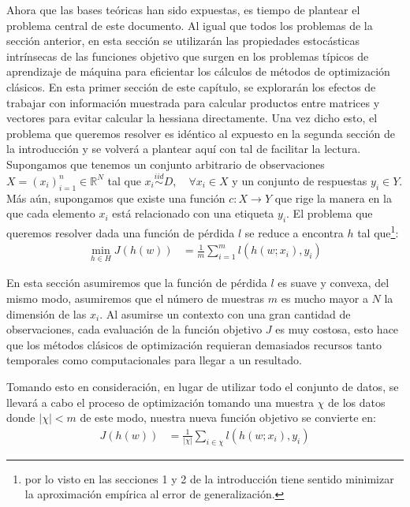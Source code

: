 \documentclass{book}
\theoremstyle{plain}
\theoremstyle{definition}
\theoremstyle{remark}
\begin{document}
Ahora que las bases teóricas han sido expuestas, es tiempo de plantear el problema central de este documento. Al igual que todos los problemas de la sección anterior, en esta sección se utilizarán las propiedades estocásticas intrínsecas de las funciones objetivo que surgen en los problemas típicos de aprendizaje de máquina para eficientar los cálculos de métodos de optimización clásicos. En esta primer sección de este capítulo, se explorarán los efectos de trabajar con información muestrada para calcular productos entre matrices y vectores para evitar calcular la hessiana directamente. Una vez dicho esto, el problema que queremos resolver es idéntico al expuesto en la segunda sección de la introducción y se volverá a plantear aquí con tal de facilitar la lectura. Supongamos que tenemos un conjunto arbitrario de observaciones $X=(x_i)_{i=1}^n\in\mathbb{R}^N$ tal que $x_i \stackrel{iid}{\sim} D,\quad\forall x_i\in X$ y un conjunto de respuestas $y_i\in Y$. Más aún, supongamos que existe una función $c:X\rightarrow Y$ que rige la manera en la que cada elemento $x_i$ está relacionado con una etiqueta $y_i$. El problema que queremos resolver dada una función de pérdida $l$ se reduce a encontra $h$ tal que\footnote{por lo visto en las secciones 1 y 2 de la introducción tiene sentido minimizar la aproximación empírica al error de generalización.}:
\begin{equation*}
\begin{split}
\displaystyle\min_{h\in H}J(h(w)) & = \frac{1}{m}\displaystyle\sum_{i = 1}^ml(h(w;x_i),y_i)
\end{split}
\end{equation*}

En esta sección asumiremos que la función de pérdida $l$ es suave y convexa, del mismo modo, asumiremos que el número de muestras $m$ es mucho mayor a $N$ la dimensión de las $x_i$. Al asumirse un contexto con una gran cantidad de observaciones,  cada evaluación de la función objetivo $J$ es muy costosa, esto hace que los métodos clásicos de optimización requieran demasiados recursos tanto temporales como computacionales para llegar a un resultado. 

Tomando esto en consideración, en lugar de utilizar todo el conjunto de datos, se llevará a cabo el proceso de optimización tomando una muestra $\chi$ de los datos donde $|\chi|<m$ de este modo, nuestra nueva función objetivo se convierte en: 
\begin{equation*}
\begin{split}
J(h(w)) & = \frac{1}{|\chi|}\displaystyle\sum_{i \in \chi}l(h(w;x_i),y_i)
\end{split}
\end{equation*}
\end{document}

